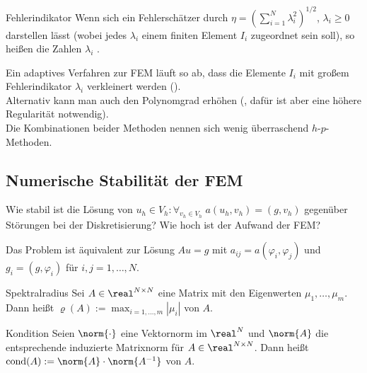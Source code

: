 \begin{Def}{Fehlerindikator}
    Wenn sich ein Fehlerschätzer durch
    $\eta = (\sum_{i=1}^N \lambda_i^2)^{1/2}$, $\lambda_i \ge 0$
    darstellen lässt (wobei jedes $\lambda_i$ einem finiten Element $I_i$
    zugeordnet sein soll), so heißen die Zahlen $\lambda_i$
    .
\end{Def}

\begin{Bem}
    Ein adaptives Verfahren zur FEM läuft so ab, dass die Elemente $I_i$ mit
    großem Fehlerindikator $\lambda_i$ verkleinert werden
    ().\\
    Alternativ kann man auch den Polynomgrad erhöhen
    (, dafür ist aber eine
    höhere Regularität notwendig).\\
    Die Kombinationen beider Methoden nennen sich wenig überraschend
    $h$-$p$-Methoden.
\end{Bem}

\pagebreak

\subsection{%
    Numerische Stabilität der FEM%
}

\begin{Bem}
    Wie stabil ist die Lösung von
    $u_h \in V_h\colon \forall_{v_h \in V_h}\; a(u_h, v_h) = (g, v_h)$
    gegenüber Störungen bei der Diskretisierung?
    Wie hoch ist der Aufwand der FEM?
\end{Bem}

\begin{Bem}
    Das Problem ist äquivalent zur Lösung $Au = g$ mit
    $a_{ij} = a(\varphi_i, \varphi_j)$ und $g_i = (g, \varphi_i)$
    für $i, j = 1, \dotsc, N$.
\end{Bem}

\begin{Def}{Spektralradius}
    Sei $A \in \real^{N \times N}$ eine Matrix mit
    den Eigenwerten $\mu_1, \dotsc, \mu_m$.\\
    Dann heißt $\varrho(A) := \max_{i=1,\dotsc,m} |\mu_i|$
     von $A$.
\end{Def}

\begin{Def}{Kondition}
    Seien $\norm{\cdot}$ eine Vektornorm im $\real^N$ und
    $\norm{A}$ die entsprechende induzierte Matrixnorm für
    $A \in \real^{N \times N}$.
    Dann heißt $\cond(A) := \norm{A} \cdot \norm{A^{-1}}$
     von $A$.
\end{Def}

